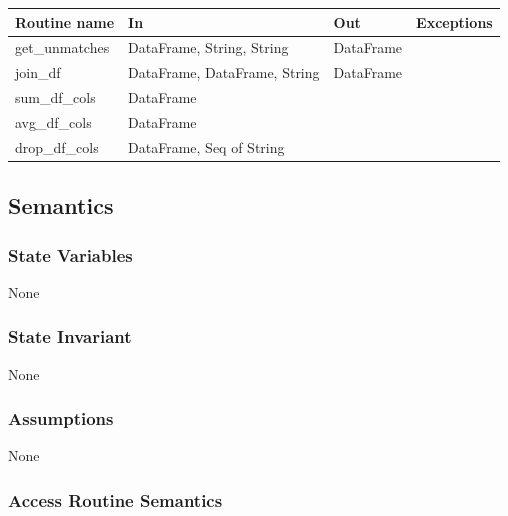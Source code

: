 \documentclass[12pt]{article}
\begin{document}
\begin{tabular}{| l | l | l | p{5cm} |}
\hline
\textbf{Routine name} & \textbf{In} & \textbf{Out} & \textbf{Exceptions}\\
\hline
get\_unmatches & DataFrame, String, String & DataFrame & \\
\hline
join\_df & DataFrame, DataFrame, String & DataFrame & \\
\hline
sum\_df\_cols & DataFrame & & \\
\hline
avg\_df\_cols & DataFrame &  & \\
\hline
drop\_df\_cols & DataFrame, Seq of String &  & \\
\hline

\end{tabular}

\subsection* {Semantics}

\subsubsection* {State Variables}

None

\subsubsection* {State Invariant}

None

\subsubsection* {Assumptions}

None

\subsubsection* {Access Routine Semantics}
\end{document}
